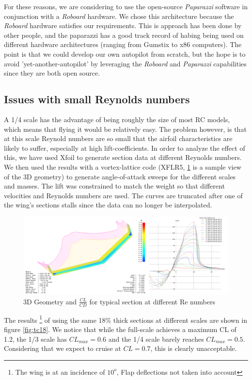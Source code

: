 \documentclass[titlepage,10pt]{article}
\begin{document}
For these reasons, we are considering to use the open-source \textit{Paparazzi} software in conjunction with a \textit{Roboard} hardware. We chose this architecture because the \textit{Roboard} hardware satisfies our requirements. This is approach has been done by other people, and the paparazzi has a good track record of habing being used on different hardware architectures (ranging from Gumstix to x86 computers). The point is that we could develop our own autopilot from scratch, but the hope is to avoid 'yet-another-autopilot' by leveraging the \textit{Roboard} and \textit{Paparazzi} capabilities since they are both open source. 

\subsection{Issues with small Reynolds numbers}
A 1/4 scale has the advantage of being roughly the size of most RC models, which means that flying it would be relatively easy. The problem however, is that at this scale Reynold numbers are so small that the airfoil characteristics are likely to suffer, especially at high lift-coefficients. In order to analyze the effect of this, we have used Xfoil to generate section data at different Reynolds numbers. We then used the results with a vortex-lattice code (XFLR5, \ref{fig:xflr3D} is a sample view of the 3D geometry) to generate angle-of-attack sweeps for the different scales and masses. The lift was constrained to match the weight so that different velocities and Reynolds numbers are used. The curves are truncated after one of the wing's sections stalls since the data can no longer be interpolated. \\

\begin{figure}[h]
\begin{center}
\includegraphics[width=120mm]{XFLR_3Dviews.png}
\end{center}
\caption{3D Geometry and $\frac{CL}{CD}$ for typical section at different Re numbers}
\label{fig:xflr3D}
\end{figure}
\newpage
The results \footnote{The wing is at an incidence of $10^o$, Flap deflections not taken into account} of using the same 18\% thick sections at different scales are shown in figure \ref{fig:tc18}. We notice that while the full-scale achieves a maximum CL of 1.2, the 1/3 scale has $CL_{max}=0.6$ and the 1/4 scale barely reaches $CL_{max}=0.5$. Considering that we expect to cruise at $CL=0.7$, this is clearly unacceptable.
\end{document}
